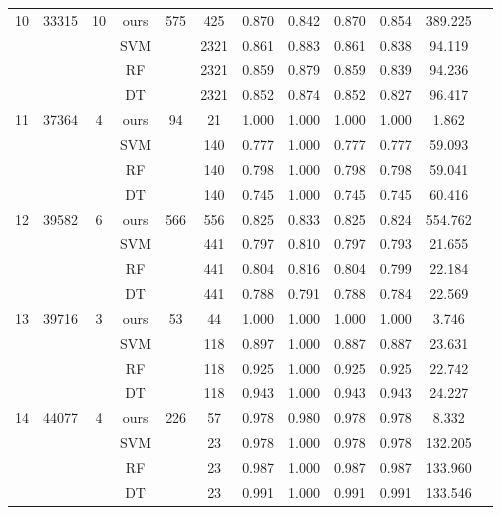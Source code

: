 \begin{table}[htbp]
\begin{tabular}{cccccccccccc}
        \midrule
        10 & 33315 & 10 & ours & 575 & 425 & 0.870 & 0.842 & 0.870 & 0.854 & 389.225 \\
           &       &    & SVM  &     & 2321 & 0.861 & 0.883 & 0.861 & 0.838 & 94.119 \\
           &       &    & RF   &     & 2321 & 0.859 & 0.879 & 0.859 & 0.839 & 94.236 \\
           &       &    & DT   &     & 2321 & 0.852 & 0.874 & 0.852 & 0.827 & 96.417 \\
        \midrule
        11 & 37364 & 4 & ours & 94  & 21  & 1.000 & 1.000 & 1.000 & 1.000 & 1.862 \\
           &       &   & SVM  &     & 140 & 0.777 & 1.000 & 0.777 & 0.777 & 59.093 \\
           &       &   & RF   &     & 140 & 0.798 & 1.000 & 0.798 & 0.798 & 59.041 \\
           &       &   & DT   &     & 140 & 0.745 & 1.000 & 0.745 & 0.745 & 60.416 \\
        \midrule
        12 & 39582 & 6 & ours & 566 & 556 & 0.825 & 0.833 & 0.825 & 0.824 & 554.762 \\
           &       &   & SVM  &     & 441 & 0.797 & 0.810 & 0.797 & 0.793 & 21.655 \\
           &       &   & RF   &     & 441 & 0.804 & 0.816 & 0.804 & 0.799 & 22.184 \\
           &       &   & DT   &     & 441 & 0.788 & 0.791 & 0.788 & 0.784 & 22.569 \\
        \midrule
        13 & 39716 & 3 & ours & 53  & 44  & 1.000 & 1.000 & 1.000 & 1.000 & 3.746 \\
           &       &   & SVM  &     & 118 & 0.897 & 1.000 & 0.887 & 0.887 & 23.631 \\
           &       &   & RF   &     & 118 & 0.925 & 1.000 & 0.925 & 0.925 & 22.742 \\
           &       &   & DT   &     & 118 & 0.943 & 1.000 & 0.943 & 0.943 & 24.227 \\
        \midrule
        14 & 44077 & 4 & ours & 226 & 57  & 0.978 & 0.980 & 0.978 & 0.978 & 8.332 \\
           &       &   & SVM  &     & 23  & 0.978 & 1.000 & 0.978 & 0.978 & 132.205 \\
           &       &   & RF   &     & 23  & 0.987 & 1.000 & 0.987 & 0.987 & 133.960 \\
           &       &   & DT   &     & 23  & 0.991 & 1.000 & 0.991 & 0.991 & 133.546 \\

        
    \bottomrule
  \end{tabular}
\end{table}

